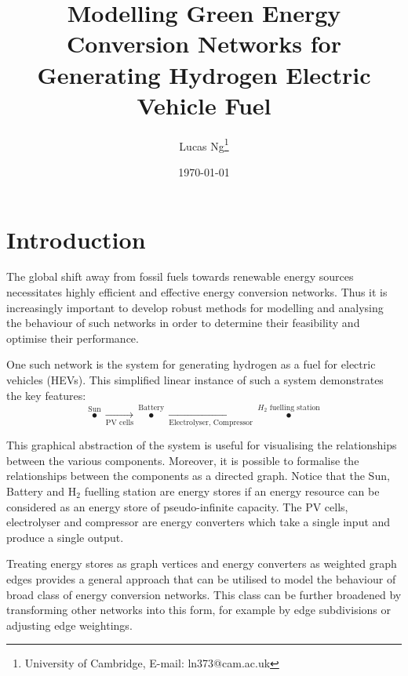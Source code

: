 \documentclass[]{article}
\title{Modelling Green Energy Conversion Networks for Generating Hydrogen Electric Vehicle Fuel}
\author{Lucas Ng\footnote{University of Cambridge, E-mail: ln373@cam.ac.uk}}
\date{\today}
\numberwithin{equation}{section}
\theoremstyle{plain} %
\theoremstyle{definition}
\theoremstyle{remark}
\begin{document}
\maketitle
{}
\newpage
\section{Introduction}

The global shift away from fossil fuels towards renewable energy sources
necessitates highly efficient and effective energy conversion networks.
Thus it is increasingly important to develop robust methods for modelling and analysing
the behaviour of such networks in order to determine their feasibility and optimise their performance.

One such network is the system for generating hydrogen as a fuel for electric vehicles (HEVs).
This simplified linear instance of such a system demonstrates the key features:
$$\overset{\text{Sun}}{\bullet} \xrightarrow[\text{PV cells}]{} \overset{\text{Battery}}{\bullet} \xrightarrow[\text{Electrolyser,\ Compressor}]{} \overset{H_{2} \text{ fuelling station}}{\bullet}$$

This graphical abstraction of the system is useful for visualising the relationships between the various components.
Moreover, it is possible to formalise the relationships between the components as a directed graph.
Notice that the Sun, Battery and $\mathrm{H_2}$ fuelling station are energy stores
if an energy resource can be considered as an energy store of pseudo-infinite capacity.
The PV cells, electrolyser and compressor are energy converters which take a single input and produce a single output.

Treating energy stores as graph vertices and energy converters as weighted graph edges
provides a general approach that can be utilised to model the behaviour of broad class of energy conversion networks.
This class can be further broadened by transforming other networks into this form,
for example by edge subdivisions or adjusting edge weightings.
\end{document}
